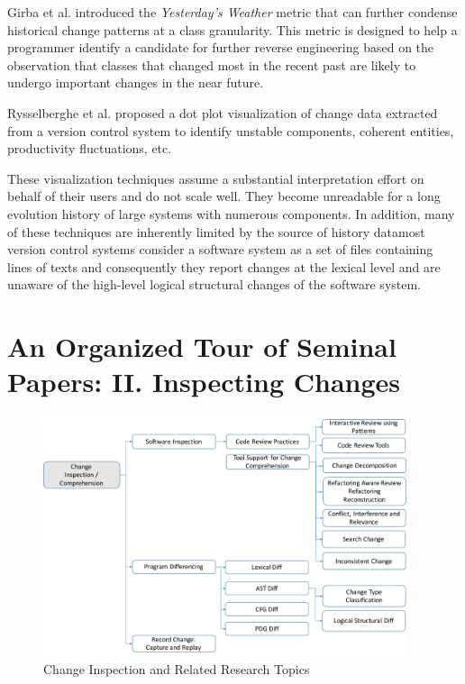 \documentclass[runningheads,a4paper]{llncs}
\begin{document}
Girba et al. \cite{Girba2004} introduced the {\it Yesterday's Weather} metric that can further condense historical change patterns at a class granularity. This metric is designed to help a programmer identify a candidate for further reverse engineering based on the observation that classes that changed most in the recent past are likely to undergo important changes in the near future. 
 
Rysselberghe et al. \cite{Rysselberghe2004a} proposed a dot plot visualization of change data extracted from a version control system to identify unstable components, coherent entities, productivity fluctuations, etc.  

These visualization techniques assume a substantial interpretation effort on behalf of their users and do not scale well. They become unreadable for a long evolution history of large systems with numerous components. In addition, many of these techniques are inherently limited by the source of history data\textemdash most version control systems consider a software system as a set of files containing lines of texts and consequently they report changes at the lexical level and are unaware of the high-level logical structural changes of the software system. 


\section{An Organized Tour of Seminal Papers: II. Inspecting Changes}
\label{sec:inspect}

\begin{figure}[ht]
 \centering
 \includegraphics[width=0.95\textwidth]{images/ChangeInspection.pdf}
 \caption{Change Inspection and Related Research Topics} 
 \label{fig:changeinspection} 
\end{figure}
\end{document}
